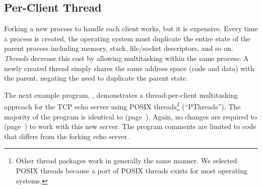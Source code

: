 \subsection{Per-Client Thread}
\label{sect:perClientThread}

\noindent Forking a new process to handle each client works, but it is
expensive.  Every time a process is created, the operating system must
duplicate the entire state of the parent process including memory, stack,
file/socket descriptors, and so on.  \emph{Threads\/} decrease this cost by
allowing multitasking within the same process: A newly created thread
simply shares the same address space (code and data)
with the parent, negating the need to duplicate the parent state. 

The next example program, ,  demonstrates
a thread-per-client multitasking approach for the TCP echo server
using POSIX threads\footnote{Other thread packages work in generally
the same manner.  We selected POSIX threads because a port of POSIX threads
exists for most operating systems.} (``PThreads'').  The majority of
the program is identical to 
(page~\pageref{code/TCPEchoServer-Fork.c}).  Again, no
changes are required to 
(page~\pageref{code/TCPEchoClient.c}) to work with this
new server.  The program comments are limited to code that differs
from the forking echo server.


